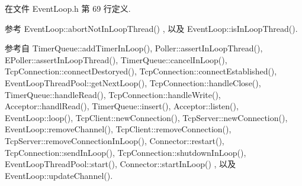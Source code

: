 在文件 Event\+Loop.\+h 第 69 行定义.



参考 Event\+Loop\+::abort\+Not\+In\+Loop\+Thread() , 以及 Event\+Loop\+::is\+In\+Loop\+Thread().



参考自 Timer\+Queue\+::add\+Timer\+In\+Loop(), Poller\+::assert\+In\+Loop\+Thread(), E\+Poller\+::assert\+In\+Loop\+Thread(), Timer\+Queue\+::cancel\+In\+Loop(), Tcp\+Connection\+::connect\+Destoryed(), Tcp\+Connection\+::connect\+Established(), Event\+Loop\+Thread\+Pool\+::get\+Next\+Loop(), Tcp\+Connection\+::handle\+Close(), Timer\+Queue\+::handle\+Read(), Tcp\+Connection\+::handle\+Write(), Acceptor\+::handl\+Read(), Timer\+Queue\+::insert(), Acceptor\+::listen(), Event\+Loop\+::loop(), Tcp\+Client\+::new\+Connection(), Tcp\+Server\+::new\+Connection(), Event\+Loop\+::remove\+Channel(), Tcp\+Client\+::remove\+Connection(), Tcp\+Server\+::remove\+Connection\+In\+Loop(), Connector\+::restart(), Tcp\+Connection\+::send\+In\+Loop(), Tcp\+Connection\+::shutdown\+In\+Loop(), Event\+Loop\+Thread\+Pool\+::start(), Connector\+::start\+In\+Loop() , 以及 Event\+Loop\+::update\+Channel().

